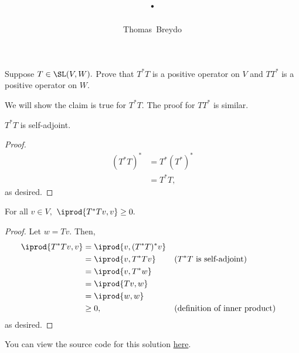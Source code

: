 \documentclass{amsart}
\title{\pagenum.\probnum}
\author{Thomas\ Breydo}
\newcommand{\pagenum}{231}
\newcommand{\probnum}{4}
\begin{document}
\maketitle

\begin{problem*}
Suppose $T\in\SL(V,W).$ Prove that $T^*T$ is a positive operator
on $V$ and $TT^*$ is a positive operator on $W.$
\end{problem*}

\vspace{0.5in}

We will show the claim is true for $T^*T.$ The proof for
$TT^*$ is similar.
\begin{claim*}
$T^*T$ is self-adjoint.
\end{claim*}
\begin{proof}
\begin{align*}
    \left(T^*T\right)^* &= T^*(T^*)^* \\
                        &= T^*T,
\end{align*}
as desired.
\end{proof}

\begin{claim*}
For all $v\in V,$ $\iprod{T^*Tv,v}\ge0.$
\end{claim*}
\begin{proof}
Let $w=Tv.$ Then,
\begin{align*}
    \iprod{T^*Tv,v} &= \iprod{v, (T^*T)^*v} \\
                    &= \iprod{v, T^*Tv} && (T^*T\text{ is self-adjoint}) \\
                    &= \iprod{v, T^*w} \\
                    &= \iprod{Tv, w} \\
                    &= \iprod{w,w} \\
                    &\ge 0, &&(\text{definition of inner product})
\end{align*} 
as desired.
\end{proof}

\vspace{0.5in}

\begin{note*}
You can view the source code for this solution
\href{https://github.com/thomasbreydo/linalg/blob/main/\pagenum_\probnum_Thomas_Breydo.tex}
{here}.
\end{note*}
\end{document}
